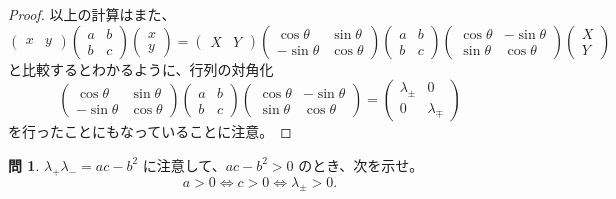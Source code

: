 \documentclass[a4paper]{jsarticle}
\theoremstyle{definition}
\newtheorem{Exercise}{問}%
\theoremstyle{remark}
\begin{document}
\begin{proof}
以上の計算はまた、
\[
\begin{pmatrix}
x & y  
\end{pmatrix}
\begin{pmatrix}
a & b\\
b & c
\end{pmatrix}
\begin{pmatrix}
x\\
y
\end{pmatrix}
= 
\begin{pmatrix}
X & Y  
\end{pmatrix}
\begin{pmatrix}
\cos\theta & \sin\theta\\
-\sin\theta & \cos\theta
\end{pmatrix}
\begin{pmatrix}
a & b\\
b & c
\end{pmatrix}
\begin{pmatrix}
\cos\theta & -\sin\theta\\
\sin\theta & \cos\theta
\end{pmatrix}
\begin{pmatrix}
X\\
Y
\end{pmatrix}
\]
と比較するとわかるように、行列の対角化
\[
\begin{pmatrix}
\cos\theta & \sin\theta\\
-\sin\theta & \cos\theta
\end{pmatrix}
\begin{pmatrix}
a & b\\
b & c
\end{pmatrix}
\begin{pmatrix}
\cos\theta & -\sin\theta\\
\sin\theta & \cos\theta
\end{pmatrix}
=
\begin{pmatrix}
\lambda_\pm & 0\\
0 & \lambda_\mp
\end{pmatrix}
\]
を行ったことにもなっていることに注意。
\end{proof}

\begin{Exercise}
$\lambda_+ \lambda_- = ac - b^2$ に注意して、$ac - b^2 > 0$  のとき、次を示せ。
\[
a>0 \iff c>0 \iff \lambda_\pm > 0. 
\]
\end{Exercise}
\end{document}
